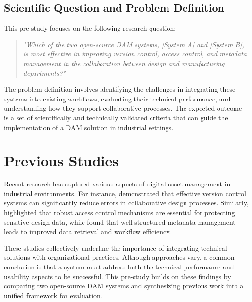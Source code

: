 \documentclass[a4paper,12pt,twocolumn]{article}
\begin{document}
\subsection{Scientific Question and Problem Definition}
This pre-study focuses on the following research question:
\begin{quote}
    \textit{"Which of the two open-source DAM systems, [System A] and [System B], is most effective in improving version control, access control, and metadata management in the collaboration between design and manufacturing departments?"}
\end{quote}
The problem definition involves identifying the challenges in integrating these systems into existing workflows, evaluating their technical performance, and understanding how they support collaborative processes. The expected outcome is a set of scientifically and technically validated criteria that can guide the implementation of a DAM solution in industrial settings.

\section{Previous Studies}
Recent research has explored various aspects of digital asset management in industrial environments. For instance, \citet{Author2020} demonstrated that effective version control systems can significantly reduce errors in collaborative design processes. Similarly, \citet{AuthorEtAl2019} highlighted that robust access control mechanisms are essential for protecting sensitive design data, while \citet{Author2021} found that well-structured metadata management leads to improved data retrieval and workflow efficiency. 

These studies collectively underline the importance of integrating technical solutions with organizational practices. Although approaches vary, a common conclusion is that a system must address both the technical performance and usability aspects to be successful. This pre-study builds on these findings by comparing two open-source DAM systems and synthesizing previous work into a unified framework for evaluation.

\end{document}
